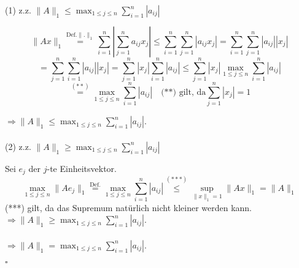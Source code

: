\documentclass[11pt,a4paper,ngerman]{article}
\begin{document}
(1) z.z. $\|A \|_1 \leq \max_{1 \leq j \leq n}{\sum_{i=1}^{n}{|a_{ij}|}}$ 

$$
\|Ax\|_{1} \stackrel{\text{Def.}\|.\|_{1}}{=}
     \sum_{i=1}^{n}{\left| \sum_{j=1}^{n}{a_{ij}x_j} \right|}
\leq \sum_{i=1}^{n}{\sum_{j=1}^{n}{\left|a_{ij}x_j\right|} }
=    \sum_{i=1}^{n}{\sum_{j=1}^{n}{|a_{ij}||x_j|} }
$$
$$
=    \sum_{j=1}^{n}{\sum_{i=1}^{n}{|a_{ij}||x_j|} }
=    \sum_{j=1}^{n}{|x_j| \sum_{i=1}^{n}{|a_{ij}|} }
\leq \sum_{j=1}^{n}{|x_j| \max_{1\leq j \leq n}{\sum_{i=1}^{n}{|a_{ij}|}} }
$$
$$
\stackrel{(**)}{=} \max_{1\leq j \leq n}{\sum_{i=1}^{n}{|a_{ij}|}} \quad \text{(**) gilt, da} \sum_{j=1}^{n}{|x_j|} = 1
$$

$\Rightarrow \|A\|_{1} \leq \max_{1 \leq j \leq n}{\sum_{i=1}^{n}{|a_{ij}|}}$. \\ \\

(2) z.z. $\|A \|_1 \geq \max_{1 \leq j \leq n}{\sum_{i=1}^{n}{|a_{ij}|}}$ 


Sei $e_j$ der $j$-te Einheitsvektor.\\
$$    \max_{1 \leq j \leq n}{\| Ae_j \|_{1}} 
\stackrel{\text{Def.}}{=}     \max_{1 \leq j \leq n}{\sum_{i=1}^{n}{|a_{ij}|}}
\stackrel{(***)}{\leq}  \sup_{\|x\|_{1} = 1}{\|Ax\|_{1}}
=     \| A \|_1
$$
(***) gilt, da das Supremum natürlich nicht kleiner werden kann.\\
$\Rightarrow \|A\|_{1} \geq \max_{1 \leq j \leq n}{\sum_{i=1}^{n}{|a_{ij}|}}$.\\ \\
$\Longrightarrow \|A\|_{1} = \max_{1 \leq j \leq n}{\sum_{i=1}^{n}{|a_{ij}|}}$.

\mbox{}\hfill $\square$

\label{LastPage}
\end{document}
